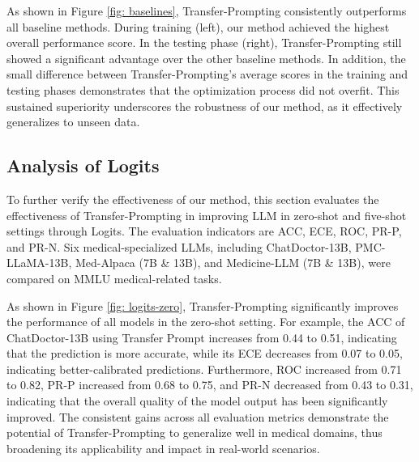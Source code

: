 As shown in Figure \ref{fig: baselines}, Transfer-Prompting consistently outperforms all baseline methods. During training (left), our method achieved the highest overall performance score. In the testing phase (right), Transfer-Prompting still showed a significant advantage over the other baseline methods. In addition, the small difference between Transfer-Prompting's average scores in the training and testing phases demonstrates that the optimization process did not overfit. This sustained superiority underscores the robustness of our method, as it effectively generalizes to unseen data.





\subsection{Analysis of Logits}
To further verify the effectiveness of our method, this section evaluates the effectiveness of Transfer-Prompting in improving LLM in zero-shot and five-shot settings through Logits. The evaluation indicators are ACC, ECE, ROC, PR-P, and PR-N. Six medical-specialized LLMs, including ChatDoctor-13B, PMC-LLaMA-13B, Med-Alpaca (7B \& 13B), and Medicine-LLM (7B \& 13B), were compared on MMLU medical-related tasks.

As shown in Figure \ref{fig: logits-zero}, Transfer-Prompting significantly improves the performance of all models in the zero-shot setting. For example, the ACC of ChatDoctor-13B using Transfer Prompt increases from 0.44 to 0.51, indicating that the prediction is more accurate, while its ECE decreases from 0.07 to 0.05, indicating better-calibrated predictions. Furthermore, ROC increased from 0.71 to 0.82, PR-P increased from 0.68 to 0.75, and PR-N decreased from 0.43 to 0.31, indicating that the overall quality of the model output has been significantly improved. 
The consistent gains across all evaluation metrics demonstrate the potential of Transfer-Prompting to generalize well in medical domains, thus broadening its applicability and impact in real-world scenarios.





